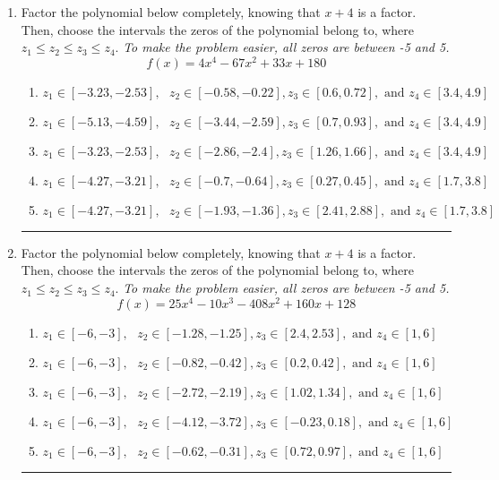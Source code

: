 \documentclass[14pt]{extbook}
\newcommand{\litem}[1]{\item#1\hspace*{-1cm}\rule{\textwidth}{0.4pt}}
\begin{document}
\begin{enumerate}
{\begin{enumerate}[label=\Alph*.]
\end{enumerate} }
\litem{
Factor the polynomial below completely, knowing that $x+4$ is a factor. Then, choose the intervals the zeros of the polynomial belong to, where $z_1 \leq z_2 \leq z_3 \leq z_4$. \textit{To make the problem easier, all zeros are between -5 and 5.}\[ f(x) = 4x^{4} -67 x^{2} +33 x + 180 \]\begin{enumerate}[label=\Alph*.]
\item \( z_1 \in [-3.23, -2.53], \text{   }  z_2 \in [-0.58, -0.22], z_3 \in [0.6, 0.72], \text{   and   } z_4 \in [3.4, 4.9] \)
\item \( z_1 \in [-5.13, -4.59], \text{   }  z_2 \in [-3.44, -2.59], z_3 \in [0.7, 0.93], \text{   and   } z_4 \in [3.4, 4.9] \)
\item \( z_1 \in [-3.23, -2.53], \text{   }  z_2 \in [-2.86, -2.4], z_3 \in [1.26, 1.66], \text{   and   } z_4 \in [3.4, 4.9] \)
\item \( z_1 \in [-4.27, -3.21], \text{   }  z_2 \in [-0.7, -0.64], z_3 \in [0.27, 0.45], \text{   and   } z_4 \in [1.7, 3.8] \)
\item \( z_1 \in [-4.27, -3.21], \text{   }  z_2 \in [-1.93, -1.36], z_3 \in [2.41, 2.88], \text{   and   } z_4 \in [1.7, 3.8] \)

\end{enumerate} }
\litem{
Factor the polynomial below completely, knowing that $x+4$ is a factor. Then, choose the intervals the zeros of the polynomial belong to, where $z_1 \leq z_2 \leq z_3 \leq z_4$. \textit{To make the problem easier, all zeros are between -5 and 5.}\[ f(x) = 25x^{4} -10 x^{3} -408 x^{2} +160 x + 128 \]\begin{enumerate}[label=\Alph*.]
\item \( z_1 \in [-6, -3], \text{   }  z_2 \in [-1.28, -1.25], z_3 \in [2.4, 2.53], \text{   and   } z_4 \in [1, 6] \)
\item \( z_1 \in [-6, -3], \text{   }  z_2 \in [-0.82, -0.42], z_3 \in [0.2, 0.42], \text{   and   } z_4 \in [1, 6] \)
\item \( z_1 \in [-6, -3], \text{   }  z_2 \in [-2.72, -2.19], z_3 \in [1.02, 1.34], \text{   and   } z_4 \in [1, 6] \)
\item \( z_1 \in [-6, -3], \text{   }  z_2 \in [-4.12, -3.72], z_3 \in [-0.23, 0.18], \text{   and   } z_4 \in [1, 6] \)
\item \( z_1 \in [-6, -3], \text{   }  z_2 \in [-0.62, -0.31], z_3 \in [0.72, 0.97], \text{   and   } z_4 \in [1, 6] \)


\end{enumerate}}
\end{enumerate}
\end{document}
